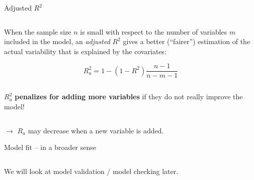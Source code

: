 \documentclass[10pt,ignorenonframetext,]{beamer}
\begin{document}
\begin{frame}

\begin{block}{Adjusted \(R^2\)}

\(~\)

When the sample size \(n\) is small with respect to the number of
variables \(m\) included in the model, an \emph{adjusted} \(R^2\) gives
a better (``fairer'') estimation of the actual variability that is
explained by the covariates:

\begin{equation*}
R^2_a = 1-(1-R^2 )\frac{n-1}{n-m-1}
\end{equation*}

\(~\)

\(R^2_a\) \textbf{penalizes for adding more variables} if they do not
really improve the model!

\(~\)

\(\rightarrow\) \(R_a\) may decrease when a new variable is added.

\end{block}

\end{frame}

\begin{frame}

\begin{block}{Model fit -- in a broader sense}

\(~\)

We will look at model validation / model checking later.

\end{block}

\end{frame}
\end{document}
